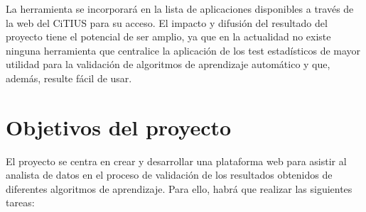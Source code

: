 La herramienta se incorporará en la lista de aplicaciones disponibles a través de la web del
CiTIUS para su acceso. El impacto y difusión del resultado del proyecto tiene el potencial de ser amplio,
ya que en la actualidad no existe ninguna herramienta que centralice la aplicación de los test estadísticos de
mayor utilidad para la validación de algoritmos de aprendizaje automático y que, además, resulte fácil de usar.


\section{Objetivos del proyecto}
El proyecto se centra en crear y desarrollar una plataforma web para asistir al analista de datos
en el proceso de validación de los resultados obtenidos de diferentes algoritmos de aprendizaje. Para ello,
habrá que realizar las siguientes tareas:
